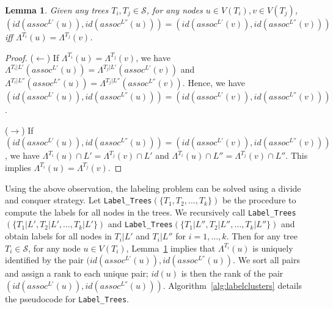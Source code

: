 \documentclass[final,1p,times]{elsarticle}
\newcommand{\leafset}{\Lambda}
\newtheorem{lemma}[theorem]{Lemma}
\begin{document}
    \begin{lemma}
        \label{lem:labelclusterscorrectness}
        Given any trees $T_i, T_j \in \mathcal{S}$, for any nodes $u \in V(T_i), v \in V(T_j)$, $(id(assoc^{L'}(u)), id(assoc^{L''}(u))) = (id(assoc^{L'}(v)), id(assoc^{L''}(v)))$ iff $\leafset^{T_i}(u) = \leafset^{T_j}(v)$.
    \end{lemma}
        \begin{proof}
		($\leftarrow$) If $\leafset^{T_i}(u) = \leafset^{T_j}(v)$, we have $\leafset^{T_i|L'}(assoc^{L'}(u)) = \leafset^{T_j|L'}(assoc^{L'}(v))$ and $\leafset^{T_i|L''}(assoc^{L''}(u)) = \leafset^{T_j|L''}(assoc^{L''}(v))$. Hence, we have $(id(assoc^{L'}(u)), id(assoc^{L''}(u))) = (id(assoc^{L'}(v)), id(assoc^{L''}(v)))$.

		($\rightarrow$) If $(id(assoc^{L'}(u)), id(assoc^{L''}(u))) = (id(assoc^{L'}(v)), id(assoc^{L''}(v)))$, we have $\Lambda^{T_i}(u) \cap L' = \Lambda^{T_j}(v) \cap L'$ and $\Lambda^{T_i}(u) \cap L'' = \Lambda^{T_j}(v) \cap L''$. This implies  $\leafset^{T_i}(u) = \leafset^{T_j}(v)$.
        \end{proof}


    Using the above observation, the labeling problem can be solved using a divide and conquer strategy. Let \texttt{Label\_Trees}$(\{T_1, T_2, \dots, T_k\})$ be the procedure to compute the labels for all nodes in the trees.
    We recursively call \texttt{Label\_Trees}$(\{T_1|L', T_2|L', \dots, T_k|L'\})$ and \texttt{Label\_Trees}$(\{T_1|L'', T_2|L'', \dots, T_k|L''\})$ and obtain labels for all nodes in $T_i|L'$ and $T_i|L''$ for $i=1, \ldots, k$.
    Then for any tree $T_i \in \mathcal{S}$, for any node $u \in V(T_i)$, Lemma~\ref{lem:labelclusterscorrectness} implies that $\leafset^{T_i}(u)$ is uniquely identified by the pair $(id(assoc^{L'}(u)), id(assoc^{L''}(u))$.
    We sort all pairs and assign a rank to each unique pair; $id(u)$ is then the rank of the pair $(id(assoc^{L'}(u)), id(assoc^{L''}(u)))$. Algorithm~\ref{alg:labelclusters} details the pseudocode for \texttt{Label\_Trees}.
\end{document}

